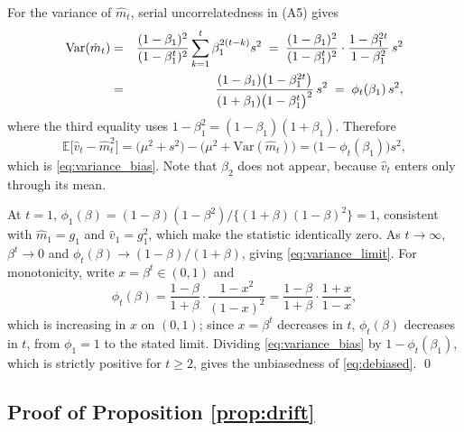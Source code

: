 \documentclass[pdflatex,sn-mathphys-num]{sn-jnl}%
\theoremstyle{thmstyleone}%
\theoremstyle{thmstyletwo}%
\theoremstyle{thmstylethree}%
\newenvironment{revblock}{}{}
\newcommand{\Var}{\mathrm{Var}}
\newcommand{\E}{\mathbb{E}}
\begin{document}
\begin{appendices}
For the variance of $\hat m_t$, serial uncorrelatedness in (A5) gives
\begin{eqnarray}
\Var(\hat m_t)
&=&
\frac{(1-\beta_1)^2}{(1-\beta_1^{t})^{2}}\sum_{k=1}^{t}\beta_1^{2(t-k)}s^2
\;=\;
\frac{(1-\beta_1)^2}{(1-\beta_1^{t})^{2}}\cdot\frac{1-\beta_1^{2t}}{1-\beta_1^{2}}\,s^2
\cr
&=&
\frac{(1-\beta_1)\bigl(1-\beta_1^{2t}\bigr)}{(1+\beta_1)\bigl(1-\beta_1^{t}\bigr)^{2}}\,s^2
\;=\;
\phi_t(\beta_1)\,s^2 ,
\end{eqnarray}
where the third equality uses $1-\beta_1^2=(1-\beta_1)(1+\beta_1)$. Therefore
\begin{equation}
\E\bigl[\hat v_t-\hat m^2_t\bigr]
=
\bigl(\mu^2+s^2\bigr)-\bigl(\mu^2+\Var(\hat m_t)\bigr)
=
\bigl(1-\phi_t(\beta_1)\bigr)s^2 ,
\end{equation}
which is \eqref{eq:variance_bias}. Note that $\beta_2$ does not appear, because $\hat v_t$ enters only through its mean.

At $t=1$, $\phi_1(\beta)=(1-\beta)(1-\beta^2)/\{(1+\beta)(1-\beta)^2\}=1$, consistent with $\hat m_1=g_1$ and $\hat v_1=g_1^2$, which make the statistic identically zero. As $t\to\infty$, $\beta^t\to0$ and $\phi_t(\beta)\to(1-\beta)/(1+\beta)$, giving \eqref{eq:variance_limit}. For monotonicity, write $x=\beta^{t}\in(0,1)$ and
\begin{equation}
\phi_t(\beta)=\frac{1-\beta}{1+\beta}\cdot\frac{1-x^{2}}{(1-x)^{2}}
=\frac{1-\beta}{1+\beta}\cdot\frac{1+x}{1-x},
\end{equation}
which is increasing in $x$ on $(0,1)$; since $x=\beta^{t}$ decreases in $t$, $\phi_t(\beta)$ decreases in $t$, from $\phi_1=1$ to the stated limit. Dividing \eqref{eq:variance_bias} by $1-\phi_t(\beta_1)$, which is strictly positive for $t\ge2$, gives the unbiasedness of \eqref{eq:debiased}. \qed

\subsection*{Proof of Proposition \ref{prop:drift}}


\end{appendices}
\end{document}
